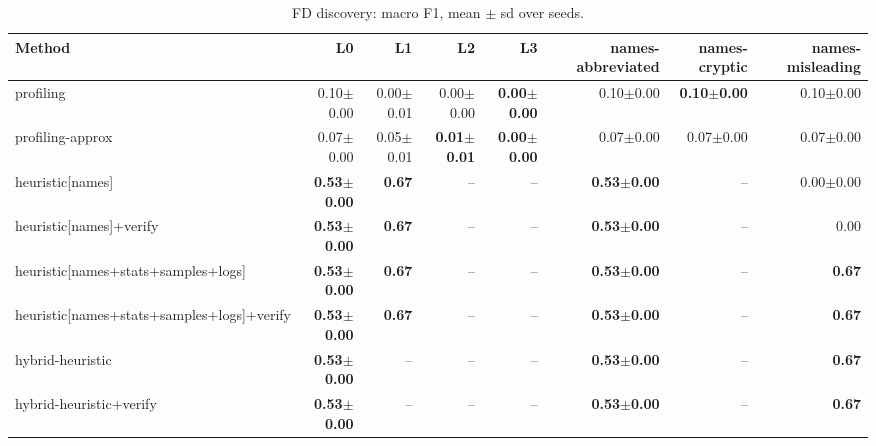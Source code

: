 \begin{table}[t]
  \centering
  \scriptsize
  \caption{FD discovery: macro F1, mean $\pm$ sd over seeds.}
  \label{tab:bench-fd}
  \begin{tabular}{lrrrrrrr}
    \toprule
    Method & L0 & L1 & L2 & L3 & names-abbreviated & names-cryptic & names-misleading \\
    \midrule
    profiling & 0.10{\scriptsize$\pm$0.00} & 0.00{\scriptsize$\pm$0.01} & 0.00{\scriptsize$\pm$0.00} & \textbf{0.00{\scriptsize$\pm$0.00}} & 0.10{\scriptsize$\pm$0.00} & \textbf{0.10{\scriptsize$\pm$0.00}} & 0.10{\scriptsize$\pm$0.00} \\
    profiling-approx & 0.07{\scriptsize$\pm$0.00} & 0.05{\scriptsize$\pm$0.01} & \textbf{0.01{\scriptsize$\pm$0.01}} & \textbf{0.00{\scriptsize$\pm$0.00}} & 0.07{\scriptsize$\pm$0.00} & 0.07{\scriptsize$\pm$0.00} & 0.07{\scriptsize$\pm$0.00} \\
    heuristic[names] & \textbf{0.53{\scriptsize$\pm$0.00}} & \textbf{0.67} & -- & -- & \textbf{0.53{\scriptsize$\pm$0.00}} & -- & 0.00{\scriptsize$\pm$0.00} \\
    heuristic[names]+verify & \textbf{0.53{\scriptsize$\pm$0.00}} & \textbf{0.67} & -- & -- & \textbf{0.53{\scriptsize$\pm$0.00}} & -- & 0.00 \\
    heuristic[names+stats+samples+logs] & \textbf{0.53{\scriptsize$\pm$0.00}} & \textbf{0.67} & -- & -- & \textbf{0.53{\scriptsize$\pm$0.00}} & -- & \textbf{0.67} \\
    heuristic[names+stats+samples+logs]+verify & \textbf{0.53{\scriptsize$\pm$0.00}} & \textbf{0.67} & -- & -- & \textbf{0.53{\scriptsize$\pm$0.00}} & -- & \textbf{0.67} \\
    hybrid-heuristic & \textbf{0.53{\scriptsize$\pm$0.00}} & -- & -- & -- & \textbf{0.53{\scriptsize$\pm$0.00}} & -- & \textbf{0.67} \\
    hybrid-heuristic+verify & \textbf{0.53{\scriptsize$\pm$0.00}} & -- & -- & -- & \textbf{0.53{\scriptsize$\pm$0.00}} & -- & \textbf{0.67} \\
    \bottomrule
  \end{tabular}
\end{table}
